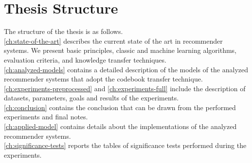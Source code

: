 \section{Thesis Structure}

The structure of the thesis is as follows.\\
\autoref{ch:state-of-the-art} describes the current state of the art in recommender systems. We present basic principles, classic and machine learning algorithms, evaluation criteria, and knowledge transfer techniques.\\
\autoref{ch:analyzed-models} contains a detailed description of the models of the analyzed recommender systems that adopt the codebook transfer technique.\\
\autoref{ch:experiments-preprocessed} and \autoref{ch:experiments-full} include the description of datasets, parameters, goals and results of the experiments.\\
\autoref{ch:conclusion} contains the conclusion that can be drawn from the performed experiments and final notes.\\
\autoref{ch:applied-model} contains details about the implementations of the analyzed recommender systems.\\
\autoref{ch:significance-tests} reports the tables of significance tests performed during the experiments.